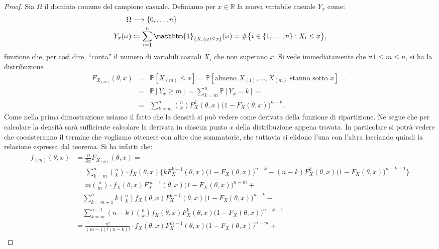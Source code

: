 \begin{proof}
Sia $\Omega$ il dominio comune del campione casuale. Definiamo per $x\in \mathbb{R}$ la nuova variabile casuale $Y_x$ come:
\begin{align*}
\Omega &\longrightarrow  \{0,\ldots,n\} \\
Y_x(\omega)  &\coloneqq   \sum_{i=1}^n \mathbbm{1}_{\{X_i(\omega)\leq x\}}(\omega)=\#\big\{i\in\{1,\ldots,n\}: X_i\leq x\big\},
\end{align*}
funzione che, per così dire, ``conta'' il numero di variabili casuali $X_i$ che non superano $x$. Si vede immediatamente che $\forall 1\leq m\leq n$, si ha la distribuzione 
\begin{eqnarray*}
F_{X_{(m)}}(\theta,x) &=& \mathbb{P}[X_{(m)} \leq x] = \mathbb{P}[\text{almeno } X_{(1)},...,X_{(m)} \text{ stanno sotto $x$}] = \\
&=& \mathbb{P}[Y_x\geq m] = \sum_{k=m}^n \mathbb{P}[Y_x=k] = \\
&=& \sum_{k=m}^n \binom{n}{k}F_X^k(\theta,x)\big(1-F_X(\theta,x)\big)^{n-k}.
\end{eqnarray*}
Come nella prima dimostrazione usiamo il fatto che la densità si può vedere come derivata della funzione di ripartizione. Ne segue che per calcolare la densità sarà sufficiente calcolare la derivata in ciascun punto $x$ della distribuzione appena trovata. In particolare si potrà vedere che coesisteranno il termine che vogliamo ottenere con altre due sommatorie, che tuttavia si elidono l'una con l'altra lasciando quindi la relazione espressa dal teorema. Si ha infatti che: 
\\
\small{
\begin{equation*}\label{e:barwq}\begin{split}
f_{(m)}(\theta,x)&=\frac{\partial}{\partial x}F_{X_{(m)}}(\theta,x)= \\
&=\sum_{k=m}^n \binom{n}{k}\cdot f_{X}(\theta,x) \bigg\{k F_X^{k-1}(\theta,x) \big(1-F_X(\theta,x)\big)^{n-k}-(n-k) F_X^{k}(\theta,x)\big(1-F_X(\theta,x)\big)^{n-k-1}\bigg\} \\
&=m\binom{n}{m}\cdot f_{X}(\theta,x)F_X^{m-1}(\theta,x) \big(1-F_X(\theta,x)\big)^{n-m} + \\ &\quad \sum_{k=m+1}^n k\binom{n}{k} f_{X}(\theta,x) F_X^{k-1}(\theta,x) \big(1-F_X(\theta,x)\big)^{n-k}- \\ &\quad\sum_{k=m}^{n-1} (n-k)\binom{n}{k} f_{X}(\theta,x) F_X^{k}(\theta,x)\big(1-F_X(\theta,x)\big)^{n-k-1} \\
&=\frac{n!}{(m-1)!(n-k)!}\cdot f_{X}(\theta,x)F_X^{m-1}(\theta,x) \big(1-F_X(\theta,x)\big)^{n-m} + \\

\end{split}
\end{equation*}}
\end{proof}
